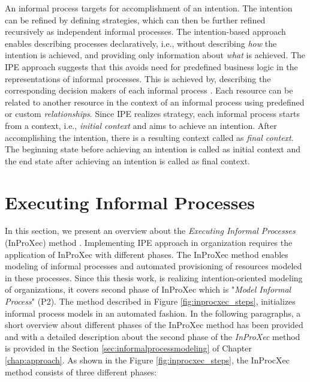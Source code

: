  An informal process targets for accomplishment of an intention. The intention can be refined by defining strategies, which can then be further refined recursively as independent informal processes. The intention-based approach enables describing processes declaratively, i.e., without describing \textit{how} the intention is achieved, and providing only information about \textit{what} is achieved. The IPE approach suggests that this avoids need for predefined business logic in the representations of informal processes. This is achieved by, describing the corresponding decision makers of each informal process \cite{Sungur2014a}. Each resource can be related to another resource in the context of an informal process using predefined or custom \textit{relationships}. Since IPE realizes strategy, each informal process starts from a context, i.e., \textit{initial context} and aims to achieve an intention. After accomplishing the intention, there is a resulting context called as \textit{final context}. The beginning state before achieving an intention is called as initial context and the end state after achieving an intention is called as final context.

\section{Executing Informal Processes}
\label{sec:inproxec}
In this section, we present an overview about the \textit{Executing Informal Processes} (InProXec) method \cite{Sungur2015}. Implementing IPE approach in organization requires the application of InProXec with different phases. The InProXec method enables modeling of informal processes and automated provisioning of resources modeled in these processes. Since this thesis work, is realizing intention-oriented modeling of organizations, it covers second phase of InProXec which is "\textit{Model Informal Process}" (P2). The method described in Figure \ref{fig:inprocxec_steps}, initializes informal process models in an automated fashion. In the following paragraphs, a short overview about different phases of the InProXec method has been provided and with a detailed description about the second phase of the \textit{InProXec} method is provided in the Section \ref{sec:informalprocessmodeling} of Chapter \ref{chap:approach}. As shown in the Figure \ref{fig:inprocxec_steps}, the InProcXec method consists of three different phases:

